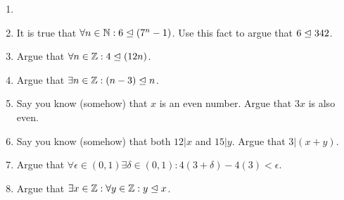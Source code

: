 \begin{xca}	
	\begin{enumerate}
		\item[]\mbox{}
		\item It is true that $\forall n \in \mathbb{N}: 6 \trianglelefteq (7^n-1)$.  Use this fact to argue that $6 \trianglelefteq 342$.
		\item Argue that $\forall n \in \mathbb{Z}:  4 \trianglelefteq (12n)$.
		\item Argue that $\exists n \in \mathbb{Z}: (n-3) \trianglelefteq n$.
		\item Say you know (somehow) that $x$ is an even number.  Argue that $3x$ is also even.
		\item Say you know (somehow) that both $12|x$ and $15|y$.  Argue that $3|(x+y)$.
		\item Argue that $\forall \epsilon \in (0,1) \exists \delta \in (0,1): 4(3+\delta)-4(3) < \epsilon$.
		\item Argue that $\exists x \in \mathbb{Z}: \forall y \in \mathbb{Z}:  y \trianglelefteq x$.
		\end{enumerate}
	\end{xca}

